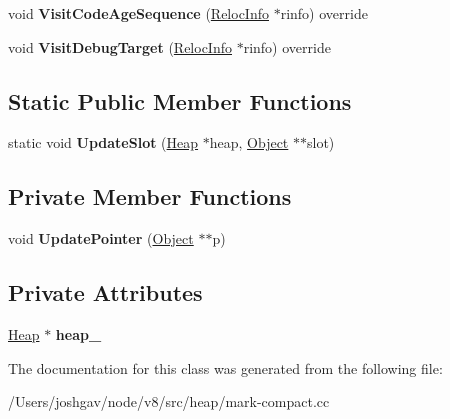 \begin{DoxyCompactItemize}
\item 
void {\bfseries Visit\+Code\+Age\+Sequence} (\hyperlink{classv8_1_1internal_1_1_reloc_info}{Reloc\+Info} $\ast$rinfo) override\hypertarget{classv8_1_1internal_1_1_pointers_updating_visitor_a8c5a43704bac85428e43fbb5274fbb37}{}\label{classv8_1_1internal_1_1_pointers_updating_visitor_a8c5a43704bac85428e43fbb5274fbb37}

\item 
void {\bfseries Visit\+Debug\+Target} (\hyperlink{classv8_1_1internal_1_1_reloc_info}{Reloc\+Info} $\ast$rinfo) override\hypertarget{classv8_1_1internal_1_1_pointers_updating_visitor_a5ca37819ce6c26107dc055e18429f14a}{}\label{classv8_1_1internal_1_1_pointers_updating_visitor_a5ca37819ce6c26107dc055e18429f14a}

\end{DoxyCompactItemize}
\subsection*{Static Public Member Functions}
\begin{DoxyCompactItemize}
\item 
static void {\bfseries Update\+Slot} (\hyperlink{classv8_1_1internal_1_1_heap}{Heap} $\ast$heap, \hyperlink{classv8_1_1internal_1_1_object}{Object} $\ast$$\ast$slot)\hypertarget{classv8_1_1internal_1_1_pointers_updating_visitor_a2035e707e8fb4f54c11c524aae9ad8e1}{}\label{classv8_1_1internal_1_1_pointers_updating_visitor_a2035e707e8fb4f54c11c524aae9ad8e1}

\end{DoxyCompactItemize}
\subsection*{Private Member Functions}
\begin{DoxyCompactItemize}
\item 
void {\bfseries Update\+Pointer} (\hyperlink{classv8_1_1internal_1_1_object}{Object} $\ast$$\ast$p)\hypertarget{classv8_1_1internal_1_1_pointers_updating_visitor_a9290cdb2ff0b798aea22fe7ddd67b9d3}{}\label{classv8_1_1internal_1_1_pointers_updating_visitor_a9290cdb2ff0b798aea22fe7ddd67b9d3}

\end{DoxyCompactItemize}
\subsection*{Private Attributes}
\begin{DoxyCompactItemize}
\item 
\hyperlink{classv8_1_1internal_1_1_heap}{Heap} $\ast$ {\bfseries heap\+\_\+}\hypertarget{classv8_1_1internal_1_1_pointers_updating_visitor_a49556b161aac9c2b7249501e00efa538}{}\label{classv8_1_1internal_1_1_pointers_updating_visitor_a49556b161aac9c2b7249501e00efa538}

\end{DoxyCompactItemize}


The documentation for this class was generated from the following file\+:\begin{DoxyCompactItemize}
\item 
/\+Users/joshgav/node/v8/src/heap/mark-\/compact.\+cc\end{DoxyCompactItemize}
